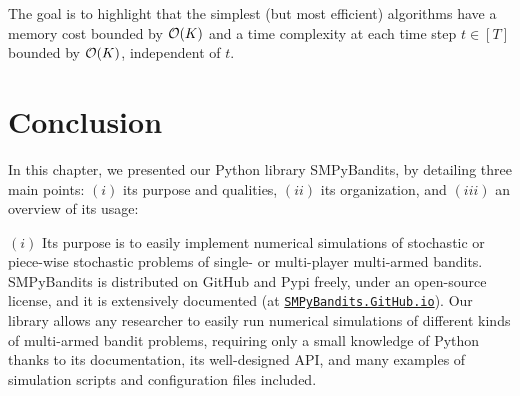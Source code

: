 The goal is to highlight that the simplest (but most efficient) algorithms have a memory cost bounded by $\mathop{}\mathopen{}\mathcal{O}\mathopen{}\left(K\right)$ and a time complexity at each time step $t\in[T]$ bounded by $\mathop{}\mathopen{}\mathcal{O}\mathopen{}\left(K\right)$, independent of $t$.









\newpage  %
\section{Conclusion}
\label{sec:3:conclusion}


In this chapter, we presented our Python library SMPyBandits, by detailing three main points:
$(i)$ its purpose and qualities,
$(ii)$ its organization,
and $(iii)$ an overview of its usage:
%

$(i)$
Its purpose is to easily implement numerical simulations of stochastic or piece-wise stochastic problems of single- or multi-player multi-armed bandits.
SMPyBandits is distributed on GitHub and Pypi freely, under an open-source license, and it is extensively documented (at \href{https://SMPyBandits.GitHub.io}{\texttt{SMPyBandits.GitHub.io}}).
Our library allows any researcher to easily run numerical simulations of different kinds of multi-armed bandit problems, requiring only a small knowledge of Python thanks to its documentation, its well-designed API, and many examples of simulation scripts and configuration files included.


